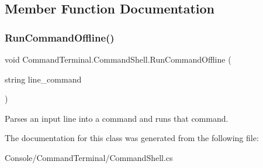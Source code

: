 \subsection{Member Function Documentation}
\mbox{\label{class_command_terminal_1_1_command_shell_af5edca56387a0b3400a8bcedf1e71274}} 
\subsubsection{\texorpdfstring{RunCommandOffline()}{RunCommandOffline()}}
{\footnotesize\ttfamily void Command\+Terminal.\+Command\+Shell.\+Run\+Command\+Offline (\begin{DoxyParamCaption}\item[{string}]{line\+\_\+command }\end{DoxyParamCaption})\hspace{0.3cm}{\ttfamily [inline]}}



Parses an input line into a command and runs that command. 



The documentation for this class was generated from the following file\+:\begin{DoxyCompactItemize}
\item 
Console/\+Command\+Terminal/Command\+Shell.\+cs\end{DoxyCompactItemize}

